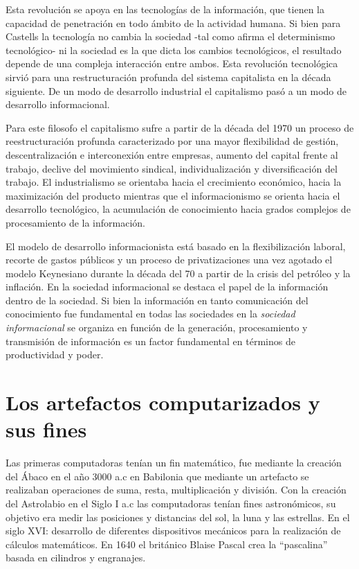 \documentclass[
  letterpaper,
  DIV=11,
  numbers=noendperiod]{scrreprt}
\begin{document}
Esta revolución se apoya en las tecnologías de la información, que
tienen la capacidad de penetración en todo ámbito de la actividad
humana. Si bien para Castells la tecnología no cambia la sociedad -tal
como afirma el determinismo tecnológico- ni la sociedad es la que dicta
los cambios tecnológicos, el resultado depende de una compleja
interacción entre ambos. Esta revolución tecnológica sirvió para una
restructuración profunda del sistema capitalista en la década siguiente.
De un modo de desarrollo industrial el capitalismo pasó a un modo de
desarrollo informacional.

Para este filosofo el capitalismo sufre a partir de la década del 1970
un proceso de reestructuración profunda caracterizado por una mayor
flexibilidad de gestión, descentralización e interconexión entre
empresas, aumento del capital frente al trabajo, declive del movimiento
sindical, individualización y diversificación del trabajo. El
industrialismo se orientaba hacia el crecimiento económico, hacia la
maximización del producto mientras que el informacionismo se orienta
hacia el desarrollo tecnológico, la acumulación de conocimiento hacia
grados complejos de procesamiento de la información.

El modelo de desarrollo informacionista está basado en la
flexibilización laboral, recorte de gastos públicos y un proceso de
privatizaciones una vez agotado el modelo Keynesiano durante la década
del 70 a partir de la crisis del petróleo y la inflación. En la sociedad
informacional se destaca el papel de la información dentro de la
sociedad. Si bien la información en tanto comunicación del conocimiento
fue fundamental en todas las sociedades en la \emph{sociedad
informacional} se organiza en función de la generación, procesamiento y
transmisión de información es un factor fundamental en términos de
productividad y poder.

\section{}\label{section}

\section{\texorpdfstring{\textbf{Los artefactos computarizados y sus
fines}}{Los artefactos computarizados y sus fines}}\label{los-artefactos-computarizados-y-sus-fines}

Las primeras computadoras tenían un fin matemático, fue mediante la
creación del Ábaco en el año 3000 a.c en Babilonia que mediante un
artefacto se realizaban operaciones de suma, resta, multiplicación y
división. Con la creación del Astrolabio en el Siglo I a.c las
computadoras tenían fines astronómicos, su objetivo era medir las
posiciones y distancias del sol, la luna y las estrellas. En el siglo
XVI: desarrollo de diferentes dispositivos mecánicos para la realización
de cálculos matemáticos. En 1640 el británico Blaise Pascal crea la
``pascalina'' basada en cilindros y engranajes.
\end{document}
